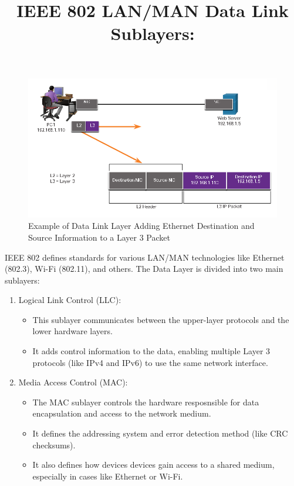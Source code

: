 \documentclass[a4paper,11pt]{article}
\begin{document}
\begin{figure}[h!]
    \centering
    \includegraphics[width=\textwidth]{16.png}
    \caption{Example of Data Link Layer Adding Ethernet Destination and Source Information to a Layer 3 Packet}
    \label{fig:cap1}
\end{figure}

\title{IEEE 802 LAN/MAN Data Link Sublayers:}
IEEE 802 defines standards for various LAN/MAN technologies like Ethernet (802.3), Wi-Fi (802.11), and others. The Data Layer is divided into two main sublayers:\\

\begin{enumerate}
    \item Logical Link Control (LLC):\\
    \begin{itemize}
        \item This sublayer communicates between the upper-layer protocols and the lower hardware layers.\\
        \item It adds control information to the data, enabling multiple Layer 3 protocols (like IPv4 and IPv6) to use the same network interface.\\
    \end{itemize}
    \item Media Access Control (MAC):\\
    \begin{itemize}
        \item The MAC sublayer controls the hardware resposnsible for data encapsulation and access to the network medium.\\
        \item It defines the addressing system and error detection method (like CRC checksums).\\
        \item It also defines how devices devices gain access to a shared medium, especially in cases like Ethernet or Wi-Fi.\\
    \end{itemize}
\end{enumerate}
\end{document}
